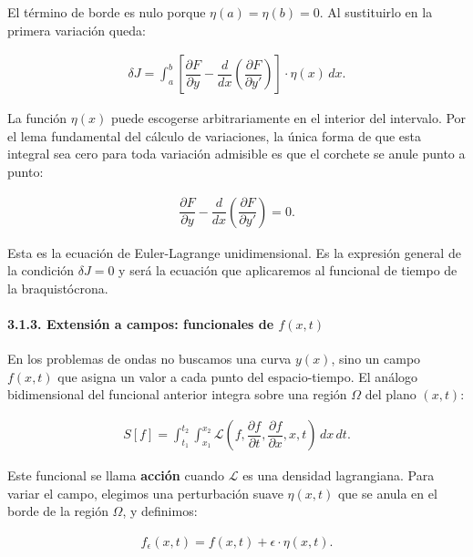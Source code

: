 \documentclass[
  spanish,
]{article}
\begin{document}
El término de borde es nulo porque \(\eta(a)=\eta(b)=0\). Al sustituirlo
en la primera variación queda:

\[
\begin{aligned}
\delta J
= \int_a^b
\left[
\dfrac{\partial F}{\partial y}
- \dfrac{d}{dx}\left(\dfrac{\partial F}{\partial y'}\right)
\right] \cdot \eta(x)\,dx.
\end{aligned}
\]

La función \(\eta(x)\) puede escogerse arbitrariamente en el interior
del intervalo. Por el lema fundamental del cálculo de variaciones, la
única forma de que esta integral sea cero para toda variación admisible
es que el corchete se anule punto a punto:

\[
\begin{aligned}
\dfrac{\partial F}{\partial y}
- \dfrac{d}{dx}\left(\dfrac{\partial F}{\partial y'}\right) = 0.
\end{aligned}
\]

Esta es la ecuación de Euler-Lagrange unidimensional. Es la expresión
general de la condición \(\delta J=0\) y será la ecuación que
aplicaremos al funcional de tiempo de la braquistócrona.

\paragraph{\texorpdfstring{3.1.3. Extensión a campos: funcionales de
\(f(x,t)\)}{3.1.3. Extensión a campos: funcionales de f(x,t)}}\label{extensiuxf3n-a-campos-funcionales-de-fxt}

En los problemas de ondas no buscamos una curva \(y(x)\), sino un campo
\(f(x,t)\) que asigna un valor a cada punto del espacio-tiempo. El
análogo bidimensional del funcional anterior integra sobre una región
\(\Omega\) del plano \((x,t)\):

\[
\begin{aligned}
S[f]
= \int_{t_1}^{t_2}\int_{x_1}^{x_2}
\mathcal{L}\left(
f,
\dfrac{\partial f}{\partial t},
\dfrac{\partial f}{\partial x},
x,t
\right)\,dx\,dt.
\end{aligned}
\]

Este funcional se llama \textbf{acción} cuando \(\mathcal{L}\) es una
densidad lagrangiana. Para variar el campo, elegimos una perturbación
suave \(\eta(x,t)\) que se anula en el borde de la región \(\Omega\), y
definimos:

\[
\begin{aligned}
f_\epsilon(x,t) = f(x,t) + \epsilon \cdot \eta(x,t).
\end{aligned}
\]
\end{document}
